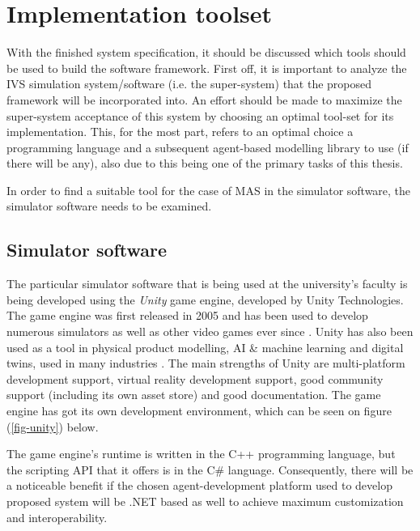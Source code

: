 \documentclass[main.tex]{subfiles}
\begin{document}
\section{Implementation toolset}\label{sec-toolset}

With the finished system specification, it should be discussed which tools should be used to build the software framework. 
First off, it is important to analyze the IVS simulation system/software (i.e. the super-system) that
the proposed framework will be incorporated into. An effort should be made to maximize the super-system acceptance of 
this system by choosing an optimal tool-set for its implementation. This, for the most part,
refers to an optimal choice a programming language and a subsequent agent-based modelling
library to use (if there will be any), also due to this being one of the primary tasks of this thesis. 

In order to find a suitable tool for the case of MAS in the simulator software, the simulator software needs to be examined.

\subsection{Simulator software}

The particular simulator software that is being used at the university's faculty is being
developed using the \emph{Unity} game engine, developed by Unity Technologies. The game engine
was first released in 2005 and has been used to develop numerous simulators as well as other
video games ever since \cite{UnityTechnologies2022}.  Unity has also been used as a tool in
physical product modelling, AI \& machine learning and digital twins, used in many industries
\cite{UnityTechnologies2022a}.  The main strengths of Unity are multi-platform development
support, virtual reality development support, good community support (including its own asset
store) and good documentation. The game engine has got its own development environment, which 
can be seen on figure (\ref{fig-unity}) below.

The game engine's runtime is written in the C++ programming language, but the scripting API 
that it offers is in the C\# language. Consequently, there will be a noticeable benefit 
if the chosen agent-development platform used to develop proposed system will be .NET based as well 
to achieve maximum customization and interoperability.
\end{document}
